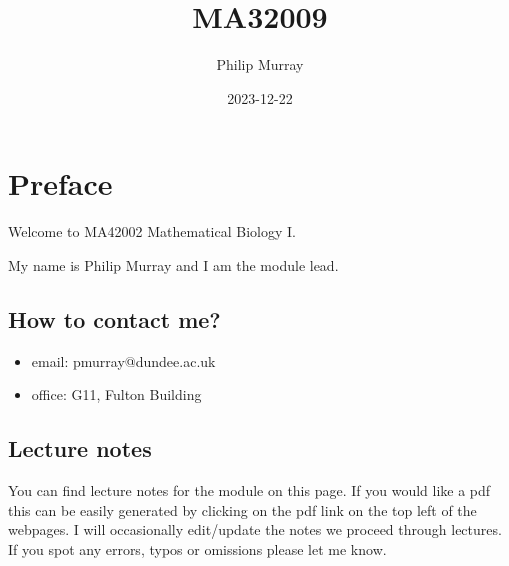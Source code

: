 \documentclass[
  letterpaper,
  DIV=11,
  numbers=noendperiod]{scrreprt}
\title{MA32009}
\author{Philip Murray}
\date{2023-12-22}
\providecommand{\tightlist}{%
  \setlength{\itemsep}{0pt}\setlength{\parskip}{0pt}}\usepackage{longtable,booktabs,array}
\renewcommand*\contentsname{Table of contents}
\newcommand\contentsname{Table of contents}
\begin{document}
\maketitle
\ifdefined\Shaded\renewenvironment{Shaded}{\begin{tcolorbox}[breakable, sharp corners, borderline west={3pt}{0pt}{shadecolor}, interior hidden, boxrule=0pt, frame hidden, enhanced]}{\end{tcolorbox}}\fi

\renewcommand*\contentsname{Table of contents}
{
\hypersetup{linkcolor=}
\setcounter{tocdepth}{2}
\tableofcontents
}

\hypertarget{preface}{%
\chapter*{Preface}\label{preface}}


Welcome to MA42002 Mathematical Biology I.

My name is Philip Murray and I am the module lead.

\hypertarget{how-to-contact-me}{%
\section*{How to contact me?}\label{how-to-contact-me}}


\begin{itemize}
\tightlist
\item
  email: pmurray@dundee.ac.uk
\item
  office: G11, Fulton Building
\end{itemize}

\hypertarget{lecture-notes}{%
\section*{Lecture notes}\label{lecture-notes}}


You can find lecture notes for the module on this page. If you would
like a pdf this can be easily generated by clicking on the pdf link on
the top left of the webpages. I will occasionally edit/update the notes
we proceed through lectures. If you spot any errors, typos or omissions
please let me know.
\end{document}

